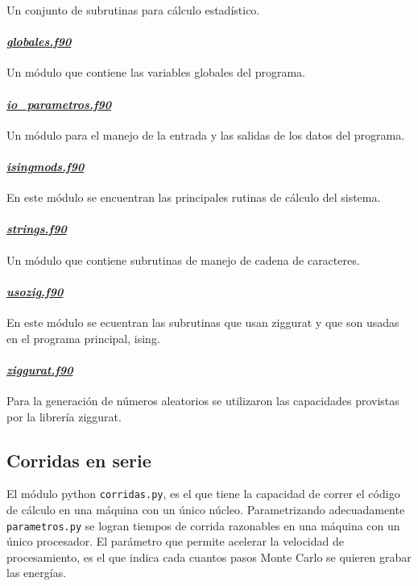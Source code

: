 Un conjunto de subrutinas para c\'alculo estad\'istico. 

\paragraph{\underline{\textit{globales.f90}}}
Un m\'odulo que contiene las variables globales del programa.
	
\paragraph{\underline{\textit{io\_parametros.f90}}}  
Un m\'odulo para el manejo de la entrada y las salidas de los
datos del programa.


\paragraph{\underline{\textit{isingmods.f90}}} 
En este m\'odulo  se encuentran las principales rutinas de c\'alculo del
sistema.


\paragraph{\underline{\textit{strings.f90}}}
Un m\'odulo que contiene subrutinas de manejo de cadena de caracteres.


\paragraph{\underline{\textit{usozig.f90}}} 
En este m\'odulo se ecuentran las subrutinas que usan ziggurat y que
son usadas en el programa principal, ising.
					
					
\paragraph{\underline{\textit{ziggurat.f90}}}

Para la generaci\'on de n\'umeros aleatorios se utilizaron
las capacidades provistas por la librer\'ia ziggurat. 


\subsection{Corridas en serie}\label{serie}
El módulo python \texttt{corridas.py}, es el que tiene la capacidad de correr
el código de cálculo en una máquina con un único núcleo. Parametrizando 
adecuadamente \texttt{parametros.py} se logran tiempos de corrida razonables en 
una máquina con un único procesador. El parámetro que permite acelerar la 
velocidad de procesamiento, es el que indica cada cuantos pasos Monte Carlo se 
quieren grabar las energías.

